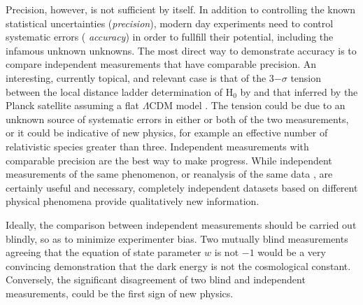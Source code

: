 
Precision, however, is not sufficient by itself. In addition to
controlling the known statistical uncertainties ({\it precision}),
modern day experiments need to control systematic errors ({\it
accuracy}) in order to fullfill their potential, including the
infamous unknown unknowns. The most direct way to demonstrate accuracy
is to compare independent measurements that have comparable
precision. An interesting, currently topical, and relevant case is
that of the 3$-\sigma$ tension between the local distance ladder
determination of H$_0$ by \citet{Rie++16} and that inferred by the
Planck satellite assuming a flat $\Lambda$CDM model \citep{Pla15}. The
tension could be due to an unknown source of systematic errors in
either or both of the two measurements, or it could be indicative of
new physics, for example an effective number of relativistic species
greater than three. Independent measurements with comparable precision
are the best way to make progress.
While independent measurements of the same phenomenon, or reanalysis of the
same data \citep{Fre++12,Rig++15,Efs14,SFH15}, are certainly useful and necessary,
completely independent datasets based on different physical phenomena
provide qualitatively new information.

Ideally, the comparison between independent measurements should be
carried out blindly, so as to minimize experimenter bias. Two mutually
blind measurements agreeing that the equation of state parameter $w$
is not $-1$ would be a very convincing demonstration that the dark
energy is not the cosmological constant. Conversely, the significant
disagreement of two blind and independent measurements, could be the
first sign of new physics.

